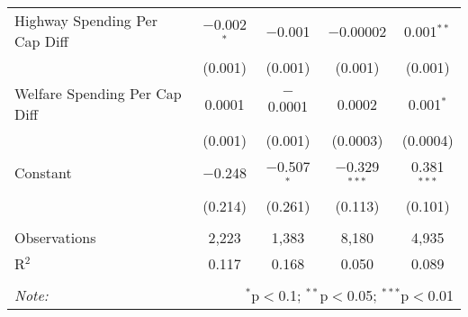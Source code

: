 \begin{table}[!htbp]
\begin{tabular}{@{\extracolsep{5pt}}lcccc}
  Highway Spending Per Cap Diff & $-$0.002$^{*}$ & $-$0.001 & $-$0.00002 & 0.001$^{**}$ \\ 
  & (0.001) & (0.001) & (0.001) & (0.001) \\ 
  Welfare Spending Per Cap Diff & 0.0001 & $-$0.0001 & 0.0002 & 0.001$^{*}$ \\ 
  & (0.001) & (0.001) & (0.0003) & (0.0004) \\ 
  Constant & $-$0.248 & $-$0.507$^{*}$ & $-$0.329$^{***}$ & 0.381$^{***}$ \\ 
  & (0.214) & (0.261) & (0.113) & (0.101) \\ 
 \hline \\[-1.8ex] 
Observations & 2,223 & 1,383 & 8,180 & 4,935 \\ 
R$^{2}$ & 0.117 & 0.168 & 0.050 & 0.089 \\ 
\hline 
\hline \\[-1.8ex] 
\textit{Note:}  & \multicolumn{4}{r}{$^{*}$p$<$0.1; $^{**}$p$<$0.05; $^{***}$p$<$0.01} \\ 
\end{tabular} 
\end{table} 

